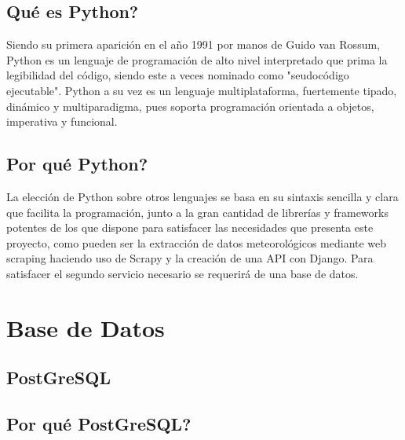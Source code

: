 \subsection{Qué es Python?}
Siendo su primera aparición en el año 1991 por manos de Guido van Rossum, Python es un lenguaje de programación de alto nivel interpretado que prima la legibilidad del código, siendo este a veces nominado como "seudocódigo ejecutable". \cite{dierbach2014python}
\newline
\newline
Python a su vez es un lenguaje multiplataforma, fuertemente tipado, dinámico y multiparadigma, pues soporta programación orientada a objetos, imperativa y funcional. \cite{PyDoc} \cite{borges2014python}

\subsection{Por qué Python?}
La elección de Python sobre otros lenguajes se basa en su sintaxis sencilla y clara que facilita la programación, junto a la gran cantidad de librerías y frameworks potentes de los que dispone para satisfacer las necesidades que presenta este proyecto, como pueden ser la extracción de datos meteorológicos mediante web scraping haciendo uso de Scrapy y la creación de una API con Django.\newline
\newline
Para satisfacer el segundo servicio necesario se requerirá de una base de datos.

\section{Base de Datos}

\subsection{PostGreSQL}

\subsection{Por qué PostGreSQL?}